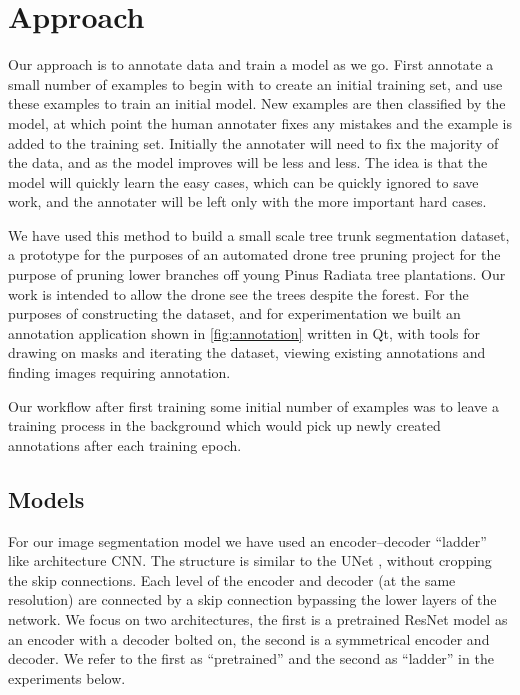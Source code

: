 \documentclass{article}
\begin{document}
\section{Approach}

Our approach is to annotate data and train a model as we go. First annotate a small number of examples to begin with to create an initial training set, and use these examples to train an initial model. New examples are then classified by the model, at which point the human annotater fixes any mistakes and the example is added to the training set. Initially the annotater will need to fix the majority of the data, and as the model improves will be less and less. The idea is that the model will quickly learn the easy cases, which can be quickly ignored to save work, and the annotater will be left only with the more important hard cases.

We have used this method to build a small scale tree trunk segmentation dataset, a prototype for the purposes of an automated drone tree pruning project for the purpose of pruning lower branches off young Pinus Radiata tree plantations. Our work is intended to allow the drone see the trees despite the forest. For the purposes of constructing the dataset, and for experimentation we built an annotation application shown in \ref{fig:annotation} written in Qt, with tools for drawing on masks and iterating the dataset, viewing existing annotations and finding images requiring annotation.

Our workflow after first training some initial number of examples was to leave a training process in the background which would pick up newly created annotations after each training epoch. 


\subsection {Models}

For our image segmentation model we have used an encoder--decoder ``ladder'' like architecture \gls{CNN}. The structure is similar to the UNet \cite{Ronneberger2015}, without cropping the skip connections.  Each level of the encoder and decoder (at the same resolution) are connected by a skip connection bypassing the lower layers of the network. We focus on two architectures, the first is a pretrained ResNet model as an encoder with a decoder bolted on, the second is a symmetrical encoder and decoder. We refer to the first as ``pretrained'' and the second as ``ladder'' in the experiments below.
\end{document}
